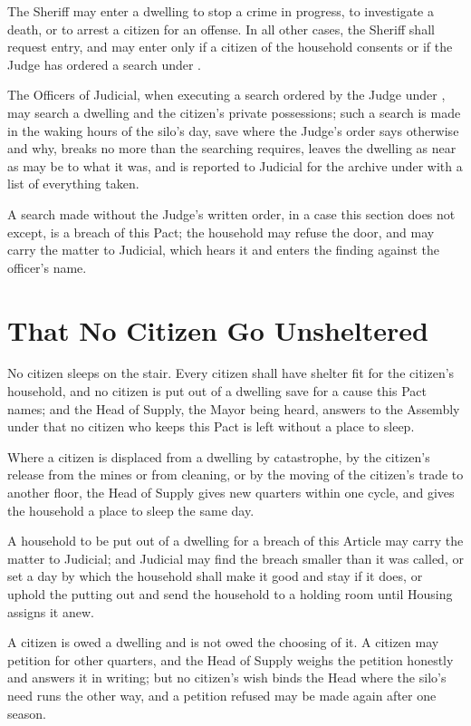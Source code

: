 \begin{clauses}
\item The Sheriff may enter a dwelling to stop a crime in progress, to investigate a death, or to arrest a citizen for an offense. In all other cases, the Sheriff shall request entry, and may enter only if a citizen of the household consents or if the Judge has ordered a search under .
\item The Officers of Judicial, when executing a search ordered by the Judge under , may search a dwelling and the citizen's private possessions; such a search is made in the waking hours of the silo's day, save where the Judge's order says otherwise and why, breaks no more than the searching requires, leaves the dwelling as near as may be to what it was, and is reported to Judicial for the archive under  with a list of everything taken.
\item A search made without the Judge's written order, in a case this section does not except, is a breach of this Pact; the household may refuse the door, and may carry the matter to Judicial, which hears it and enters the finding against the officer's name.
\end{clauses}

\section{That No Citizen Go Unsheltered}
\label{sec:housing:that-no-citizen-go-unsheltered}

No citizen sleeps on the stair. Every citizen shall have shelter fit for the citizen's household, and no citizen is put out of a dwelling save for a cause this Pact names; and the Head of Supply, the Mayor being heard, answers to the Assembly under  that no citizen who keeps this Pact is left without a place to sleep.

\begin{clauses}
\item Where a citizen is displaced from a dwelling by catastrophe, by the citizen's release from the mines or from cleaning, or by the moving of the citizen's trade to another floor, the Head of Supply gives new quarters within one cycle, and gives the household a place to sleep the same day.
\item A household to be put out of a dwelling for a breach of this Article may carry the matter to Judicial; and Judicial may find the breach smaller than it was called, or set a day by which the household shall make it good and stay if it does, or uphold the putting out and send the household to a holding room until Housing assigns it anew.
\item A citizen is owed a dwelling and is not owed the choosing of it. A citizen may petition for other quarters, and the Head of Supply weighs the petition honestly and answers it in writing; but no citizen's wish binds the Head where the silo's need runs the other way, and a petition refused may be made again after one season.
\end{clauses}

